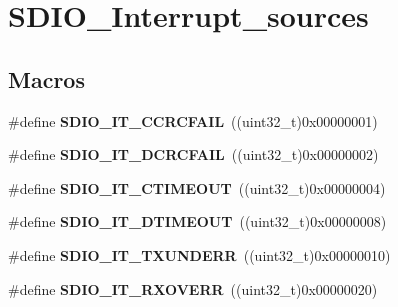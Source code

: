 \hypertarget{group___s_d_i_o___interrupt__sources}{}\section{S\+D\+I\+O\+\_\+\+Interrupt\+\_\+sources}
\label{group___s_d_i_o___interrupt__sources}
\subsection*{Macros}
\begin{DoxyCompactItemize}
\item 
\hypertarget{group___s_d_i_o___interrupt__sources_gabb076105e18355a260c40a379511e72f}{}\#define {\bfseries S\+D\+I\+O\+\_\+\+I\+T\+\_\+\+C\+C\+R\+C\+F\+A\+I\+L}~((uint32\+\_\+t)0x00000001)\label{group___s_d_i_o___interrupt__sources_gabb076105e18355a260c40a379511e72f}

\item 
\hypertarget{group___s_d_i_o___interrupt__sources_gaf3321305cb4e24419185a4b92ead299a}{}\#define {\bfseries S\+D\+I\+O\+\_\+\+I\+T\+\_\+\+D\+C\+R\+C\+F\+A\+I\+L}~((uint32\+\_\+t)0x00000002)\label{group___s_d_i_o___interrupt__sources_gaf3321305cb4e24419185a4b92ead299a}

\item 
\hypertarget{group___s_d_i_o___interrupt__sources_ga3c2fdef0993f10e65d4fddbdf71febed}{}\#define {\bfseries S\+D\+I\+O\+\_\+\+I\+T\+\_\+\+C\+T\+I\+M\+E\+O\+U\+T}~((uint32\+\_\+t)0x00000004)\label{group___s_d_i_o___interrupt__sources_ga3c2fdef0993f10e65d4fddbdf71febed}

\item 
\hypertarget{group___s_d_i_o___interrupt__sources_gaf5ce4bfa8459ccbe892791e5cdc26a6f}{}\#define {\bfseries S\+D\+I\+O\+\_\+\+I\+T\+\_\+\+D\+T\+I\+M\+E\+O\+U\+T}~((uint32\+\_\+t)0x00000008)\label{group___s_d_i_o___interrupt__sources_gaf5ce4bfa8459ccbe892791e5cdc26a6f}

\item 
\hypertarget{group___s_d_i_o___interrupt__sources_ga93d4dbe3162b8507b2834a3e29e6c648}{}\#define {\bfseries S\+D\+I\+O\+\_\+\+I\+T\+\_\+\+T\+X\+U\+N\+D\+E\+R\+R}~((uint32\+\_\+t)0x00000010)\label{group___s_d_i_o___interrupt__sources_ga93d4dbe3162b8507b2834a3e29e6c648}

\item 
\hypertarget{group___s_d_i_o___interrupt__sources_ga272953292e1b43b2108b00e75db76512}{}\#define {\bfseries S\+D\+I\+O\+\_\+\+I\+T\+\_\+\+R\+X\+O\+V\+E\+R\+R}~((uint32\+\_\+t)0x00000020)\label{group___s_d_i_o___interrupt__sources_ga272953292e1b43b2108b00e75db76512}


\end{DoxyCompactItemize}
